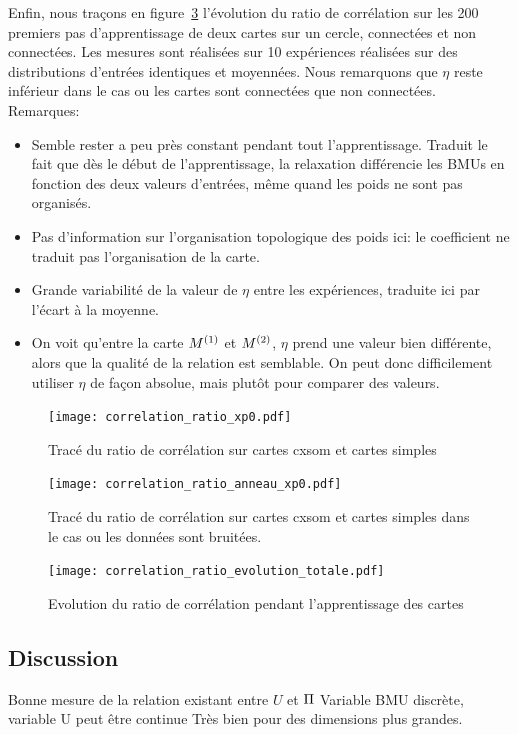 \documentclass[../main]{subfiles}
\begin{document}
Enfin, nous traçons en figure~\ref{fig:cr_evol} l'évolution du ratio de corrélation sur les 200 premiers pas d'apprentissage de deux cartes sur un cercle, connectées et non connectées. Les mesures sont réalisées sur 10 expériences réalisées sur des distributions d'entrées identiques et moyennées.
Nous remarquons que $\eta$ reste inférieur dans le cas ou les cartes sont connectées que non connectées. 
Remarques:
\begin{itemize}
    \item Semble rester a peu près constant pendant tout l'apprentissage. Traduit le fait que dès le début de l'apprentissage, la relaxation différencie les BMUs en fonction des deux valeurs d'entrées, même quand les poids ne sont pas organisés.
    \item Pas d'information sur l'organisation topologique des poids ici: le coefficient ne traduit pas l'organisation de la carte.
    \item Grande variabilité de la valeur de $\eta$ entre les expériences, traduite ici par l'écart à la moyenne.
    \item On voit qu'entre la carte $M^{({1})}$ et $M^{({2})}$, $\eta$ prend une valeur bien différente, alors que la qualité de la relation est semblable. On peut donc difficilement utiliser $\eta$ de façon absolue, mais plutôt pour comparer des valeurs.
\end{itemize}

\begin{figure}
    \texttt{[image: correlation\_ratio\_xp0.pdf]}
    \caption{Tracé du ratio de corrélation sur cartes cxsom et cartes simples \label{fig:cr_xp}}
\end{figure}

\begin{figure}
    \texttt{[image: correlation\_ratio\_anneau\_xp0.pdf]}
    \caption{Tracé du ratio de corrélation sur cartes cxsom et cartes simples dans le cas ou les données sont bruitées.\label{fig:cr_bruit}}
\end{figure}

\begin{figure}
    \texttt{[image: correlation\_ratio\_evolution\_totale.pdf]}
    \caption{Evolution du ratio de corrélation pendant l'apprentissage des cartes\label{fig:cr_evol}}
\end{figure}

\subsection{Discussion}
Bonne mesure de la relation existant entre $U$ et $\Pi$
Variable BMU discrète, variable U peut être continue
Très bien pour des dimensions plus grandes.
\end{document}
